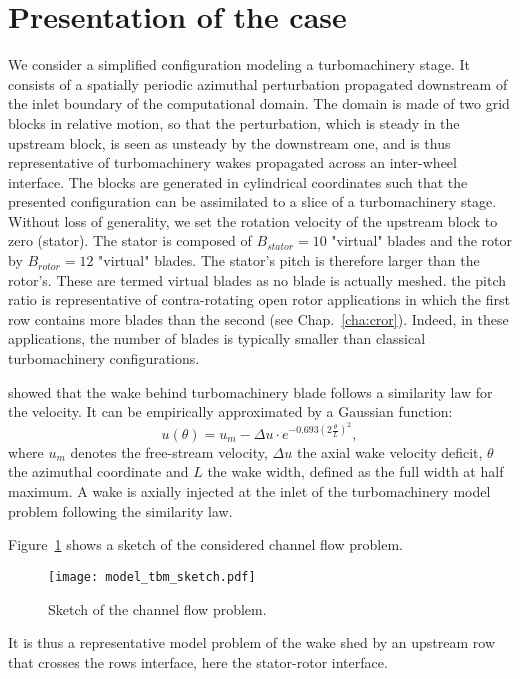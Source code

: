
\section{Presentation of the case}

We consider a simplified 
configuration modeling a turbomachinery 
stage. It consists of a spatially 
periodic azimuthal perturbation propagated downstream 
of the inlet boundary of the computational domain. 
The domain is made of two grid blocks in relative 
motion, so that the perturbation, which is steady 
in the upstream block, is seen as unsteady by the 
downstream one, and is thus representative of 
turbomachinery wakes propagated across an inter-wheel interface.
The blocks are generated in cylindrical
coordinates such that the presented configuration
can be assimilated to a slice of 
a turbomachinery stage.
Without loss of generality, 
we set the rotation velocity of the upstream block to zero (stator). 
The stator is composed of $B_{stator} = 10$
"virtual" blades and the rotor by $B_{rotor} = 12$ "virtual" blades.
The stator's pitch is therefore larger than the rotor's.
These are termed virtual blades as no blade is actually meshed.
the pitch ratio is representative of 
contra-rotating open rotor applications in which 
the first row contains more blades 
than the second (see Chap.~\ref{cha:cror}). Indeed, in
these applications, the number
of blades is typically smaller than classical
turbomachinery configurations.

\citet{Lakshminarayana1980} showed that the wake
behind turbomachinery blade follows a similarity law for the velocity. 
It can be empirically approximated by a Gaussian function:
\begin{equation}
    u (\theta) = u_m - 
        \Delta u \cdot e^{
          -0.693 \left( 2 \frac{\theta}{L} \right) ^ 2},
    \label{eq:similarity}
\end{equation}
where $u_m$ denotes the free-stream velocity, $\Delta u$ the axial wake velocity deficit,
$\theta$ the azimuthal coordinate and $L$ the wake width,
defined as the full width at half maximum.
A wake is axially injected at the inlet of the
turbomachinery model problem following the \citet{Lakshminarayana1980}
similarity law.

Figure~\ref{fig:model_tbm_sketch} shows a sketch
of the considered channel flow problem.
\begin{figure}[htp]
  \centering
  \texttt{[image: model\_tbm\_sketch.pdf]}
  \caption{Sketch of the channel flow problem.}
  \label{fig:model_tbm_sketch}
\end{figure}
It is thus a representative model problem of the wake shed
by an upstream row that crosses the rows interface, 
here the stator-rotor interface.

